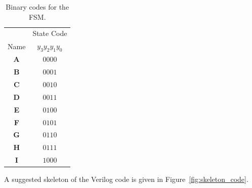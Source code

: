 \documentclass[epsfig,10pt,fullpage]{article}
\begin{document}
\begin{table}[H]
\begin{center}
\begin{tabular}{c|c}
~ & State Code \\ 
Name & $y_3 y_2 y_1 y_0$ \\ \hline
\rule[-0.075in]{0in}{0.25in}{\bf A} & $0000$ \\ 
{\bf B} & $0001$ \\ 
{\bf C} & $0010$ \\ 
{\bf D} & $0011$ \\ 
{\bf E} & $0100$ \\ 
{\bf F} & $0101$ \\ 
{\bf G} & $0110$ \\ 
{\bf H} & $0111$ \\ 
{\bf I} & $1000$ \\ 
\end{tabular}
\end{center}
\caption{Binary codes for the FSM.}
\label{tab:bincodes}
\end{table}

A suggested skeleton of the Verilog code is given in Figure~\ref{fig:skeleton_code}.
\end{document}
